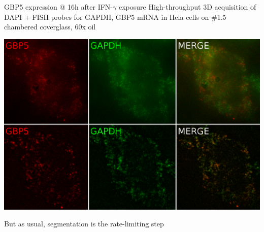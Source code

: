 \documentclass{beamer}					%
\begin{document}
\begin{frame}{GBP5 expression @ 16h after IFN-$\gamma$ exposure}
High-throughput 3D acquisition of DAPI + FISH probes for GAPDH, GBP5 mRNA in Hela cells on \#1.5 chambered coverglass, 60x oil

\begin{center}
\includegraphics[width=1\textwidth]{Stains.png}
\end{center}

But as usual, segmentation is the rate-limiting step
\end{frame}
\end{document}
